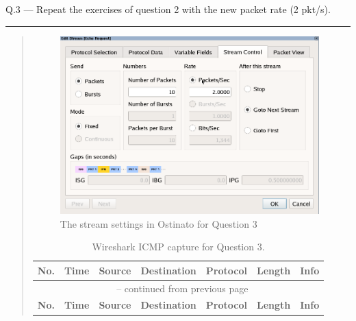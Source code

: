 \documentclass{article}
\newcommand\Que[2]{%
\begin{samepage}
\leavevmode\par
\noindent
Q.#1 --- #2\par\vspace{10pt}\hrule\vspace{10pt}
\end{samepage}}
\newenvironment{ans}
{\fbox{Answer}\begin{quote}\nopagebreak}
{\end{quote}}
\newcommand\INFOCOLSIZE{13em}
\begin{document}
\newpage

\Que{3}{Repeat the exercises of question 2 with the new packet
rate (2 pkt/s).}

\begin{ans}
\begin{figure}[H]
\centering
\includegraphics[width=10cm]{data/q3-stream-settings.png}
\caption{The stream settings in Ostinato for Question 3}
\label{fig:stream-settings-q3}
\end{figure}

\begin{center}
\begin{longtable}{|l|l|l|l|l|l|p{\INFOCOLSIZE}|}
\caption{Wireshark ICMP capture for Question 3.}
\label{longtable:wireshark-cap-q3}                                                                             \\
\hline
\multicolumn{1}{|c|}{\textbf{No.}}        &
\multicolumn{1}{c|}{\textbf{Time}}        &
\multicolumn{1}{c|}{\textbf{Source}}      &
\multicolumn{1}{c|}{\textbf{Destination}} &
\multicolumn{1}{c|}{\textbf{Protocol}}    &
\multicolumn{1}{c|}{\textbf{Length}}      &
\multicolumn{1}{c|}{\textbf{Info}}                                                                             \\
\hline
\endfirsthead

\multicolumn{7}{c}{\tablename\ \thetable{} -- continued from previous page}                                    \\
\hline
\multicolumn{1}{|c|}{\textbf{No.}}        &
\multicolumn{1}{c|}{\textbf{Time}}        &
\multicolumn{1}{c|}{\textbf{Source}}      &
\multicolumn{1}{c|}{\textbf{Destination}} &
\multicolumn{1}{c|}{\textbf{Protocol}}    &
\multicolumn{1}{c|}{\textbf{Length}}      &
\multicolumn{1}{c|}{\textbf{Info}}                                                                             \\
\hline
\endhead


\end{longtable}
\end{center}
\end{ans}
\end{document}
